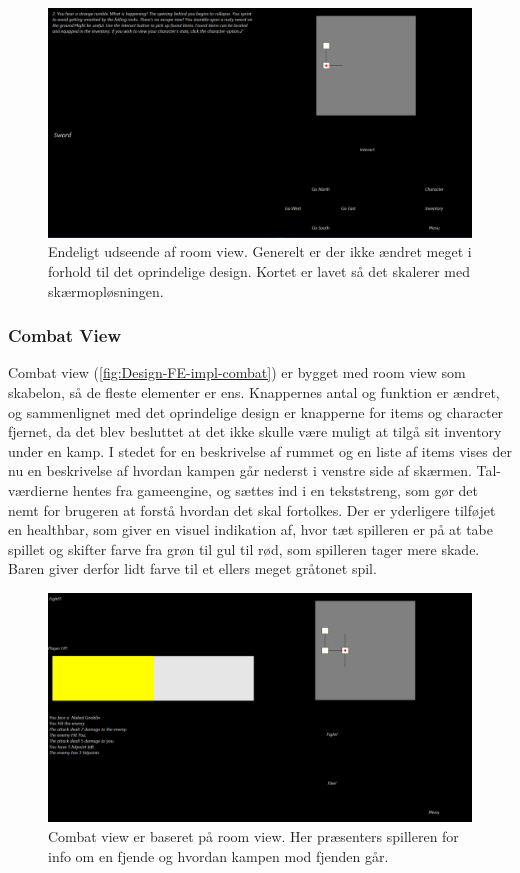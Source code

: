\begin{figure}[H]
\centering
\includegraphics[width = \textwidth]{02-Body/Images/room_final.PNG}
\caption{Endeligt udseende af room view. Generelt er der ikke ændret meget i forhold til det oprindelige design. Kortet er lavet så det skalerer med skærmopløsningen.}
\label{fig:Design-FE-impl-room}
\end{figure}

\subsubsection{Combat View}

Combat view (\autoref{fig:Design-FE-impl-combat}) er bygget med room view som skabelon, så de fleste elementer er ens. Knappernes antal og funktion er ændret, og sammenlignet med det oprindelige design er knapperne for items og character fjernet, da det blev besluttet at det ikke skulle være muligt at tilgå sit inventory under en kamp. I stedet for en beskrivelse af rummet og en liste af items vises der nu en beskrivelse af hvordan kampen går nederst i venstre side af skærmen. Tal-værdierne hentes fra gameengine, og sættes ind i en tekststreng, som gør det nemt for brugeren at forstå hvordan det skal fortolkes. Der er yderligere tilføjet en healthbar, som giver en visuel indikation af, hvor tæt spilleren er på at tabe spillet og skifter farve fra grøn til gul til rød, som spilleren tager mere skade. Baren giver derfor lidt farve til et ellers meget gråtonet spil.

\begin{figure}[H]
\centering
\includegraphics[width = \textwidth]{02-Body/Images/combat_final.PNG}
\caption{Combat view er baseret på room view. Her præsenters spilleren for info om en fjende og hvordan kampen mod fjenden går.}
\label{fig:Design-FE-impl-combat}
\end{figure}


